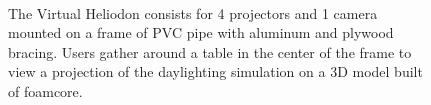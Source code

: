 \documentclass[10pt]{article}
\begin{document}
\begin{figure}[h]
\centering
{}
 \\
\caption{ The Virtual Heliodon consists for 4 projectors and 1 camera
  mounted on a frame of PVC pipe with aluminum and plywood bracing.
  Users gather around a table in the center of the frame to view a
  projection of the daylighting simulation on a 3D model built of
  foamcore.}
\label{FIGURE_contraption}
\end{figure}
\end{document}
